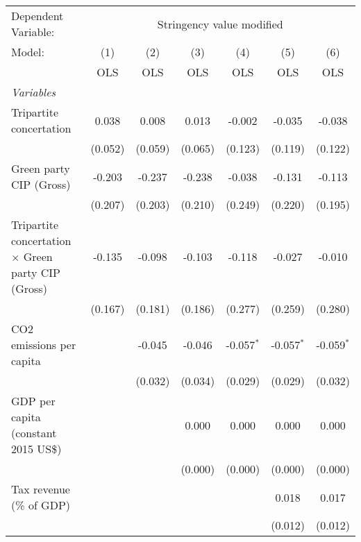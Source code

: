
\begingroup
\centering
\begin{tabular}{lcccccc}
   \toprule
   Dependent Variable: & \multicolumn{6}{c}{Stringency value modified}\\
   Model:                                                    & (1)     & (2)     & (3)     & (4)          & (5)          & (6)\\  
                                                             &  OLS    & OLS     & OLS     & OLS          & OLS          & OLS\\  
   \midrule
   \emph{Variables}\\
   Tripartite concertation                                   & 0.038   & 0.008   & 0.013   & -0.002       & -0.035       & -0.038\\   
                                                             & (0.052) & (0.059) & (0.065) & (0.123)      & (0.119)      & (0.122)\\   
   Green party CIP (Gross)                                   & -0.203  & -0.237  & -0.238  & -0.038       & -0.131       & -0.113\\   
                                                             & (0.207) & (0.203) & (0.210) & (0.249)      & (0.220)      & (0.195)\\   
   Tripartite concertation $\times$ Green party CIP (Gross)  & -0.135  & -0.098  & -0.103  & -0.118       & -0.027       & -0.010\\   
                                                             & (0.167) & (0.181) & (0.186) & (0.277)      & (0.259)      & (0.280)\\   
   CO2 emissions per capita                                  &         & -0.045  & -0.046  & -0.057$^{*}$ & -0.057$^{*}$ & -0.059$^{*}$\\   
                                                             &         & (0.032) & (0.034) & (0.029)      & (0.029)      & (0.032)\\   
   GDP per capita (constant 2015 US\$)                       &         &         & 0.000   & 0.000        & 0.000        & 0.000\\   
                                                             &         &         & (0.000) & (0.000)      & (0.000)      & (0.000)\\   
   Tax revenue (\% of GDP)                                   &         &         &         &              & 0.018        & 0.017\\   
                                                             &         &         &         &              & (0.012)      & (0.012)\\   

\end{tabular}
